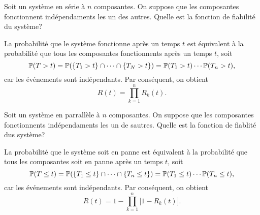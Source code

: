 \documentclass[11pt]{article}
\renewcommand\P{%
	\ensuremath{%
		\mathbb{P}%
	}%
}%
\begin{document}
\begin{exemple}
	Soit un système en série à $n$ composantes. On suppose que les composantes
	fonctionnent indépendaments les un des autres. Quelle est la fonction de
	fiabilité du système?
\end{exemple}
\addtocounter{exemple}{-1}
\begin{exemple}[suite]
	La probabilité que le système fonctionne après un temps $t$ est équivalent
	à la probabilité que tous les composantes fonctionnents après un temps $t$,
	soit
	\begin{equation*}
		\P(T>t)
		=\P(\left\{T_1>t\right\}\cap\cdots\cap\left\{T_N>t\right\})
		=\P(T_1>t)\cdots\P(T_n>t),
	\end{equation*}
	car les événements sont indépendants. Par conséquent, on obtient
	\begin{equation*}
		R(t)=\prod_{k=1}^n R_k(t).
	\end{equation*}
\end{exemple}

\begin{exemple}
	Soit un système en parrallèle à $n$ composantes. On suppose que les
	composantes fonctionnents indépendaments les un de sautres. Quelle est la
	fonction de fiablité dus système?

	La probabilité que le système soit en panne est équivalent à la probabilité
	que tous les composantes soit en panne après un temps $t$, soit
	\begin{equation*}
		\P(T\leq t)
		=\P(\left\{T_1\leq t\right\}\cap\cdots\cap\left\{T_n\leq t\right\})
		=\P(T_1\leq t)\cdots\P(T_n\leq t),
	\end{equation*}
	car les événements sont indépendants. Par conséquent, on obtient
	\begin{equation*}
		R(t)=1-\prod_{k=1}^n\bigg[1-R_k(t)\bigg].
	\end{equation*}
\end{exemple}
\end{document}
